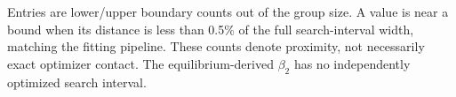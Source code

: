 \begin{table}[htbp]
\centering
\caption{Boundary diagnostics for participant-level kinetic estimates.}
\label{tab:parameter-bound-diagnostics}
\small
{}
\par\smallskip
\begin{minipage}{\linewidth}\footnotesize
Entries are lower/upper boundary counts out of the group size. A value is near a bound when its distance is less than 0.5\% of the full search-interval width, matching the fitting pipeline. These counts denote proximity, not necessarily exact optimizer contact. The equilibrium-derived $\beta_2$ has no independently optimized search interval.
\end{minipage}
\end{table}
